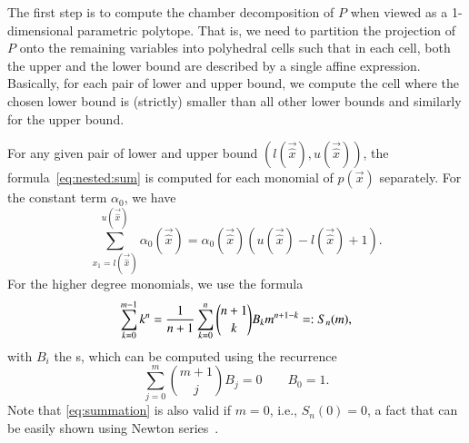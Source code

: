 The first step is to compute the chamber decomposition of $P$ when viewed
as a 1-dimensional parametric polytope.  That is, we need to partition
the projection of $P$ onto the remaining variables into polyhedral cells
such that in each cell, both the upper and the lower bound are described
by a single affine expression.  Basically, for each pair of lower and upper
bound, we compute the cell where the chosen lower bound is (strictly)
smaller than all other lower bounds and similarly for the upper bound.

For any given pair of lower and upper bound $(l(\vec {\hat x}), u(\vec{\hat x}))$,
the formula~\eqref{eq:nested:sum} is computed for each monomial of $p(\vec x)$
separately.  For the constant term $\alpha_0$, we have
\begin{equation}
\label{eq:summation:1d}
\sum_{x_1 = l(\vec {\hat x})}^{u(\vec{\hat x})} \alpha_0(\vec{\hat x})
    = \alpha_0(\vec{\hat x}) \left(u(\vec{\hat x}) - l(\vec {\hat x}) + 1\right)
.
\end{equation}
For the higher degree monomials, we use the formula
\begin{equation}
\label{eq:summation}
\sum_{k=0}^{m-1} k^n = {1\over{n+1}}\sum_{k=0}^n{n+1\choose{k}} B_k m^{n+1-k}
=: S_n(m)
,
\end{equation}
with $B_i$ the s, which can be computed
using the recurrence
\begin{equation}
\label{eq:Bernoulli}
    \sum_{j=0}^m{m+1\choose{j}}B_j = 0
\qquad B_0 = 1
.
\end{equation}
Note that \eqref{eq:summation} is also valid if $m = 0$,
i.e., $S_n(0) = 0$, a fact
that can be easily shown using Newton series~.


